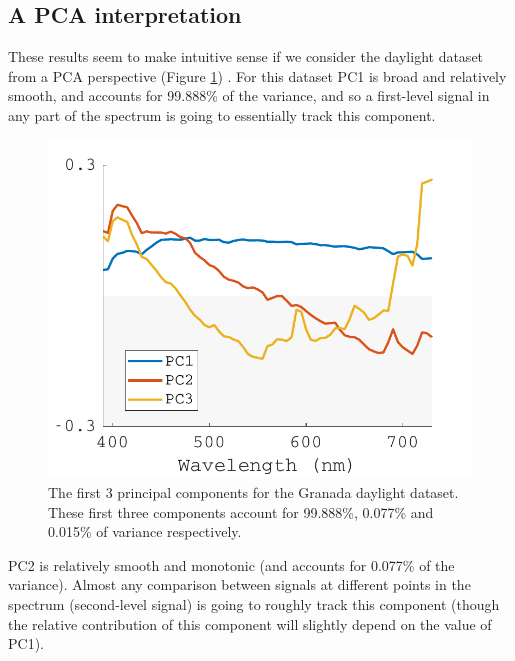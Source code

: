 \subsection{A PCA interpretation}

These results seem to make intuitive sense if we consider the daylight dataset from a \gls{PCA} perspective (Figure \ref{fig:melPCA})%
. For this dataset \gls{PC1} is broad and relatively smooth, and accounts for 99.888\% of the variance, and so a first-level signal in any part of the spectrum is going to essentially track this component. 

\begin{figure}[htbp]
 \includegraphics[max width=\textwidth]{figs/comp/melcomp_3/PC.pdf} %
 \caption{The first 3 principal components for the Granada daylight dataset. These first three components account for 99.888\%, 0.077\% and 0.015\% of variance respectively.}
 \label{fig:melPCA}
\end{figure} 

\Gls{PC2} is relatively smooth and monotonic (and accounts for 0.077\% of the variance). Almost any comparison between signals at different points in the spectrum (second-level signal) is going to roughly track this component (though the relative contribution of this component will slightly depend on the value of \gls{PC1}).

